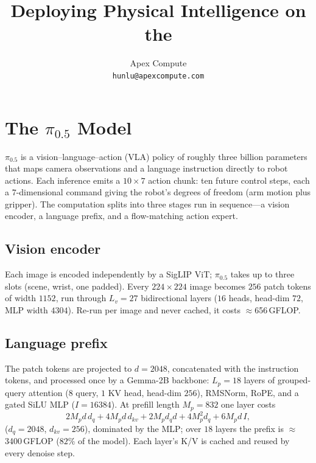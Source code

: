 \documentclass[11pt]{article}
\title{\vspace{-2em}Deploying Physical Intelligence \pizero{} on the \ue{}}
\author{Apex Compute\\[1pt]\texttt{hunlu@apexcompute.com}}
\date{\vspace{-1em}}
\newcommand{\pizero}{$\pi_{0.5}$}
\begin{document}
\maketitle

\section{The \pizero{} Model}
\label{sec:model}
\pizero{} is a vision--language--action (VLA) policy of roughly three billion
parameters that maps camera observations and a language instruction directly to
robot actions. Each inference emits a $10{\times}7$ action chunk: ten future
control steps, each a $7$-dimensional command giving the robot's degrees of
freedom (arm motion plus gripper). The computation splits into three stages run
in sequence---a vision encoder, a language prefix, and a flow-matching action
expert.

\subsection{Vision encoder}
Each image is encoded independently by a SigLIP ViT; \pizero{} takes up to three
slots (scene, wrist, one padded). Every $224{\times}224$ image becomes $256$
patch tokens of width $1152$, run through $L_v{=}27$ bidirectional layers
($16$ heads, head-dim $72$, MLP width $4304$). Re-run per image and never
cached, it costs $\approx$656\,GFLOP.

\subsection{Language prefix}
The patch tokens are projected to $d{=}2048$, concatenated with the instruction
tokens, and processed once by a Gemma-2B backbone: $L_p{=}18$ layers of
grouped-query attention ($8$ query, $1$ KV head, head-dim $256$), RMSNorm, RoPE,
and a gated SiLU MLP ($I{=}16384$). At prefill length $M_p{=}832$ one layer costs
\begin{equation}
2 M_p d\, d_{q} + 4 M_p d\, d_{kv} + 2 M_p d_{q} d
+ 4 M_p^2 d_{q} + 6 M_p d\, I ,
\end{equation}
($d_q{=}2048$, $d_{kv}{=}256$), dominated by the MLP; over $18$ layers the
prefix is $\approx$3400\,GFLOP ($82\%$ of the model). Each layer's K/V is cached
and reused by every denoise step.
\end{document}
